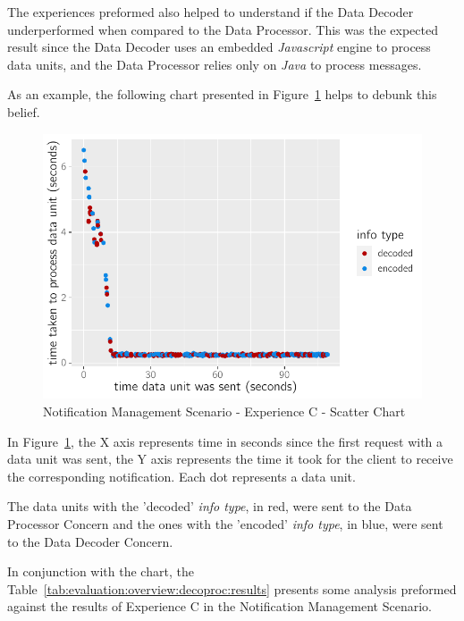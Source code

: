 The experiences preformed also helped to understand if the Data Decoder  underperformed when compared to the Data Processor. This was the expected result since the Data Decoder uses an embedded \textit{Javascript} engine to process data units, and the Data Processor relies only on \textit{Java} to process messages.

As an example, the following chart presented in Figure~\ref{fig:evaluation:overview:decoproc:chart:s3eC} helps to debunk this belief.

\begin{figure}[H]
    \centering
    \includegraphics[page=1]{assets/charts/s3eC.pdf}
    \caption[Notification Management Scenario - Experience C - Scatter Chart]{Notification Management Scenario - Experience C - Scatter Chart}
    \label{fig:evaluation:overview:decoproc:chart:s3eC}
\end{figure}

In Figure~\ref{fig:evaluation:overview:decoproc:chart:s3eC}, the X axis represents time in seconds since the first request with a data unit was sent, the Y axis represents the time it took for the client to receive the corresponding notification. Each dot represents a data unit.

The data units with the 'decoded' \textit{info type}, in red, were sent to the Data Processor Concern and the ones with the 'encoded' \textit{info type}, in blue, were sent to the Data Decoder Concern.

In conjunction with the chart, the Table~\ref{tab:evaluation:overview:decoproc:results} presents some analysis preformed against the results of Experience C in the Notification Management Scenario.

